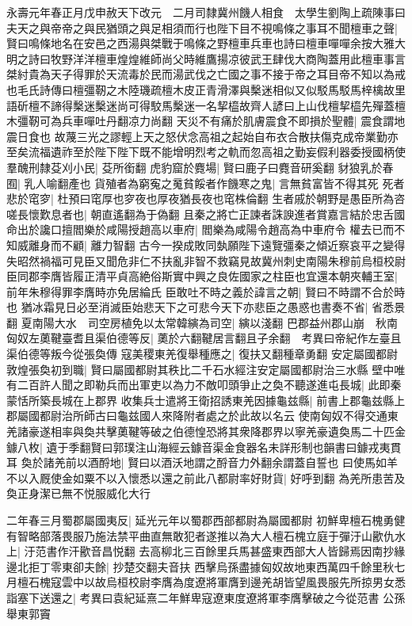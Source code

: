 永壽元年春正月戊申赦天下改元　二月司隸冀州饑人相食　太學生劉陶上疏陳事曰夫天之與帝帝之與民猶頭之與足相須而行也陛下目不視鳴條之事耳不聞檀車之聲|{
	賢曰鳴條地名在安邑之西湯與桀戰于鳴條之野檀車兵車也詩曰檀車嘽嘽余按大雅大明之詩曰牧野洋洋檀車煌煌維師尚父時維鷹揚凉彼武王肆伐大商陶蓋用此檀車事言桀紂貴為天子得罪於天流毒於民而湯武伐之亡國之事不接于帝之耳目帝不知以為戒也毛氏詩傳曰檀彊靭之木陸璣疏檀木皮正青滑澤與檕迷相似又似駁馬駁馬梓檎故里語斫檀不諦得檕迷檕迷尚可得駮馬檕迷一名挈橀故齊人諺曰上山伐檀挈橀先殫蓋檀木彊靭可為兵車嘽吐丹翻凉力尚翻}
天災不有痛於肌膚震食不即損於聖體|{
	震食謂地震日食也}
故蔑三光之謬輕上天之怒伏念高祖之起始自布衣合散扶傷克成帝業勤亦至矣流福遺祚至於陛下陛下既不能增明烈考之軌而忽高祖之勤妄假利器委授國柄使羣醜刑隸芟刈小民|{
	芟所銜翻}
虎豹窟於麑場|{
	賢曰鹿子曰麑音研奚翻}
豺狼乳於春囿|{
	乳人喻翻產也}
貨殖者為窮寃之䰟貧餒者作饑寒之鬼|{
	言無貧富皆不得其死}
死者悲於窀穸|{
	杜預曰窀厚也穸夜也厚夜猶長夜也窀株倫翻}
生者戚於朝野是愚臣所為咨嗟長懷歎息者也|{
	朝直遙翻為于偽翻}
且秦之將亡正諫者誅諛進者賞嘉言結於忠舌國命出於讒口擅閻樂於咸陽授趙高以車府|{
	閻樂為咸陽令趙高為中車府令}
權去已而不知威離身而不顧|{
	離力智翻}
古今一揆成敗同埶願陛下遠覽彊秦之傾近察哀平之變得失昭然禍福可見臣又聞危非仁不扶亂非智不救竊見故冀州刺史南陽朱穆前烏桓校尉臣同郡李膺皆履正清平貞高絶俗斯實中興之良佐國家之柱臣也宜還本朝夾輔王室|{
	前年朱穆得罪李膺時亦免居綸氏}
臣敢吐不時之義於諱言之朝|{
	賢曰不時謂不合於時也}
猶冰霜見日必至消滅臣始悲天下之可悲今天下亦悲臣之愚惑也書奏不省|{
	省悉景翻}
夏南陽大水　司空房植免以太常韓縯為司空|{
	縯以淺翻}
巴郡益州郡山崩　秋南匈奴左薁鞬臺耆且渠伯德等反|{
	薁於六翻鞬居言翻且子余翻　考異曰帝紀作左臺且渠伯德等叛今從張奐傳}
寇美稷東羌復舉種應之|{
	復扶又翻種章勇翻}
安定屬國都尉敦煌張奐初到職|{
	賢曰屬國都尉其秩比二千石水經注安定屬國都尉治三水縣}
壁中唯有二百許人聞之即勒兵而出軍吏以為力不敵叩頭爭止之奐不聽遂進屯長城|{
	此即秦蒙恬所築長城在上郡界}
收集兵士遣將王衛招誘東羌因據龜兹縣|{
	前書上郡龜兹縣上郡屬國都尉治所師古曰龜兹國人來降附者處之於此故以名云}
使南匈奴不得交通東羌諸豪遂相率與奐共擊薁鞬等破之伯德惶恐將其衆降郡界以寧羌豪遺奐馬二十匹金鐻八枚|{
	遺于季翻賢曰郭璞注山海經云鐻音渠金食器名未詳形制也韻書曰鐻戎夷貫耳}
奐於諸羌前以酒酹地|{
	賢曰以酒沃地謂之酹音力外翻余謂蓋自誓也}
曰使馬如羊不以入厩使金如粟不以入懷悉以還之前此八都尉率好財貨|{
	好呼到翻}
為羌所患苦及奐正身潔已無不悦服威化大行

二年春三月蜀郡屬國夷反|{
	延光元年以蜀郡西部都尉為屬國都尉}
初鮮卑檀石槐勇健有智略部落畏服乃施法禁平曲直無敢犯者遂推以為大人檀石槐立庭于彈汙山歠仇水上|{
	汙范書作汗歠音昌悦翻}
去高柳北三百餘里兵馬甚盛東西部大人皆歸焉因南抄緣邊北拒丁零東卻夫餘|{
	抄楚交翻夫音扶}
西擊烏孫盡據匈奴故地東西萬四千餘里秋七月檀石槐寇雲中以故烏桓校尉李膺為度遼將軍膺到邊羌胡皆望風畏服先所掠男女悉詣塞下送還之|{
	考異曰袁紀延熹二年鮮卑寇遼東度遼將軍李膺擊破之今從范書}
公孫舉東郭竇

